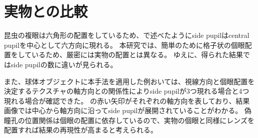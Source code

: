 \newpage
\section{実物との比較}
\label{SCompareWithReal}

昆虫の複眼は六角形の配置をしているため、で述べたようにside pupilはcentral pupilを中心として六方向に現れる。
本研究では、簡単のために格子状の個眼配置をしているため、厳密には実物の配置とは異なる。
ゆえに、得られた結果ではside pupilの数に違いが見られる。

また、球体オブジェクトに本手法を適用した例おいては、視線方向と個眼配置を決定するテクスチャの軸方向との関係性によりside pupilが3つ現れる場合と4つ現れる場合が確認できた。
の赤い矢印がそれぞれの軸方向を表しており、結果画像では中心から軸方向に沿ってside pupilが展開されていることがわかる。
偽瞳孔の位置関係は個眼の配置に依存しているので、実物の個眼と同様にレンズを配置すれば結果の再現性が高まると考えられる。
